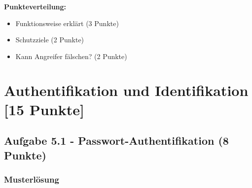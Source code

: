 \documentclass[12pt,a4paper]{article}
\begin{document}
\textbf{Punkteverteilung:}
\begin{itemize}
    \item Funktionsweise erklärt (3 Punkte) \checkmark
    \item Schutzziele (2 Punkte) \checkmark
    \item Kann Angreifer fälschen? (2 Punkte) \checkmark
\end{itemize}


\newpage

\section{Authentifikation und Identifikation [15 Punkte]}

\subsection{Aufgabe 5.1 - Passwort-Authentifikation (8 Punkte)}

\subsubsection*{Musterlösung}
\end{document}

